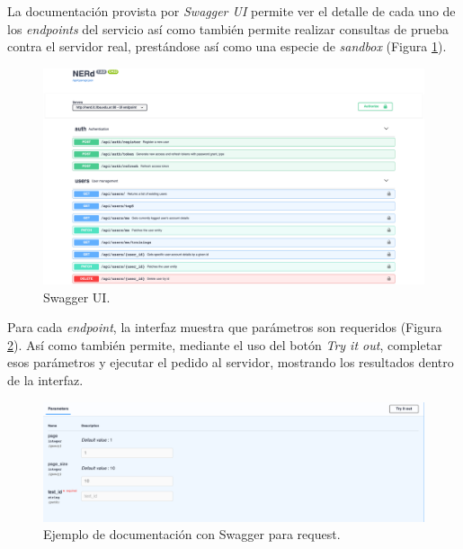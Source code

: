 \documentclass[12pt,a4paper,]{scrartcl}
\begin{document}
La documentación provista por \emph{Swagger UI} permite ver el detalle de cada uno de los \emph{endpoints} del servicio así como también permite realizar consultas de prueba contra el servidor real, prestándose así como una especie de \emph{sandbox} (Figura \ref{fig:logic-swagger-main}).

\begin{figure}[H]

{\centering \includegraphics{assets/logic/swagger-main.pdf} 

}

\caption{Swagger UI.}\label{fig:logic-swagger-main}
\end{figure}

Para cada \emph{endpoint}, la interfaz muestra que parámetros son requeridos (Figura \ref{fig:logic-swagger-request}). Así como también permite, mediante el uso del botón \emph{Try it out}, completar esos parámetros y ejecutar el pedido al servidor, mostrando los resultados dentro de la interfaz.

\begin{figure}[H]

{\centering \includegraphics{assets/logic/swagger-request.pdf} 

}

\caption{Ejemplo de documentación con Swagger para request.}\label{fig:logic-swagger-request}
\end{figure}
\end{document}
